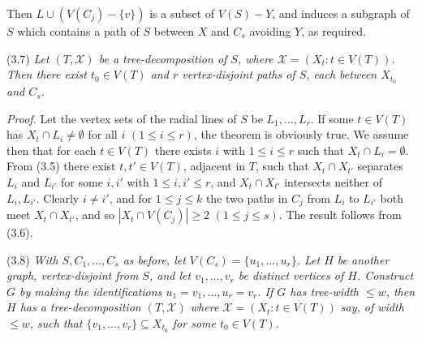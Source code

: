 Then $L \cup (V(C_j) - \{v\})$ is a subset of $V(S) - Y$, and induces a subgraph of $S$ which contains a path of $S$ between $X$ and $C_s$ avoiding $Y$, as required.

\stmt
(3.7) \textit{Let $(T, \mathcal{X})$ be a tree-decomposition of $S$, where $\mathcal{X} = (X_t : t \in V(T))$. Then there exist $t_0 \in V(T)$ and $r$ vertex-disjoint paths of $S$, each between $X_{t_0}$ and $C_s$.}

\textit{Proof.} Let the vertex sets of the radial lines of $S$ be $L_1, \dots, L_r$. If some $t \in V(T)$ has $X_t \cap L_i \ne \emptyset$ for all $i$ $(1 \le i \le r)$, the theorem is obviously true. We assume then that for each $t \in V(T)$ there exists $i$ with $1 \le i \le r$ such that $X_t \cap L_i = \emptyset$. From (3.5) there exist $t, t' \in V(T)$, adjacent in $T$, such that $X_t \cap X_{t'}$ separates $L_i$ and $L_{i'}$ for some $i, i'$ with $1 \le i, i' \le r$, and $X_t \cap X_{t'}$ intersects neither of $L_i, L_{i'}$. Clearly $i \ne i'$, and for $1 \le j \le k$ the two paths in $C_j$ from $L_i$ to $L_{i'}$ both meet $X_t \cap X_{t'}$, and so $|X_t \cap V(C_j)| \ge 2$ $(1 \le j \le s)$. The result follows from (3.6).

\stmt
(3.8) \textit{With $S, C_1, \dots, C_s$ as before, let $V(C_s) = \{u_1, \dots, u_r\}$. Let $H$ be another graph, vertex-disjoint from $S$, and let $v_1, \dots, v_r$ be distinct vertices of $H$. Construct $G$ by making the identifications $u_1 = v_1, \dots, u_r = v_r$. If $G$ has tree-width $\le w$, then $H$ has a tree-decomposition $(T, \mathcal{X})$ where $\mathcal{X} = (X_t : t \in V(T))$ say, of width $\le w$, such that $\{v_1, \dots, v_r\} \subseteq X_{t_0}$ for some $t_0 \in V(T)$.}

